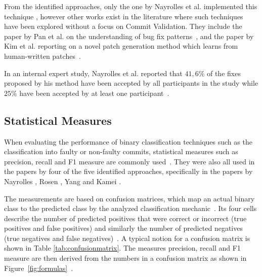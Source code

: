 From the identified approaches, only the one by Nayrolles et al. implemented this technique \cite{Nayrolles2018}, 
however other works exist
in the literature where such techniques have been explored without a focus on Commit Validation. %
They include the paper by Pan et al. on the understanding of bug fix patterns~\cite{Pan2009}, and the paper by Kim et al. reporting on a novel patch generation method which learns from human-written patches~\cite{Kim2013}.

In an internal expert study, Nayrolles et al. reported that $41,6\%$ of the fixes proposed by his method have been accepted by all participants in the study while $25\%$ have been accepted by at least one participant~\cite{Nayrolles2018}.

\subsection{Statistical Measures}
\label{sec:statisticalmeasures}


When evaluating the performance of binary classification techniques such as the classification into faulty or non-faulty commits, statistical measures such as precision, recall and F1 measure are commonly used~\cite{Powers2007}. They were also all used in the papers by four of the five identified approaches, specifically in the papers by Nayrolles \cite{Nayrolles2018}, Rosen \cite{Rosen2015}, Yang \cite{Yang2015} and Kamei \cite{Kamei2013}.


The measurements are based on confusion matrices, which map an actual binary class to the predicted class by the analyzed classification mechanic~\cite{Powers2007}. Its four cells describe the number of predicted positives that were correct or incorrect (true positives and false positives) and similarly the number of predicted negatives (true negatives and false negatives)~\cite{Fawcett2006}. A typical notion for a confusion matrix is shown in Table \ref{tab:confusionmatrix}.
The measures precision, recall and F1 measure are then derived from the numbers in a confusion matrix as shown in Figure~\ref{fig:formulas}~\cite{Powers2007}.

